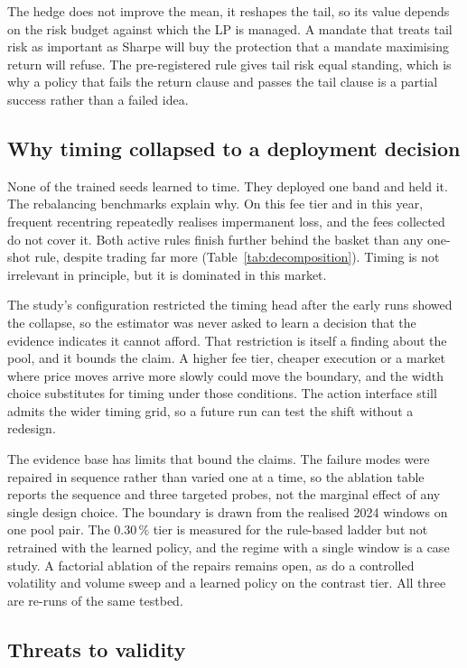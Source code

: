 The hedge does not improve the mean, it reshapes the tail, so its value depends
on the risk budget against which the LP is managed. A mandate that treats tail
risk as important as Sharpe will buy the protection that a mandate maximising
return will refuse. The pre-registered rule gives tail risk equal standing,
which is why a policy that fails the return clause and passes the tail clause
is a partial success rather than a failed idea.

\subsection{Why timing collapsed to a deployment decision}

None of the trained seeds learned to time. They deployed one band and held it.
The rebalancing benchmarks explain why. On this fee tier and in this year,
frequent recentring repeatedly realises impermanent loss, and the fees
collected do not cover it. Both active rules finish further behind the basket
than any one-shot rule, despite trading far more
(Table~\ref{tab:decomposition}). Timing is not irrelevant in principle, but it
is dominated in this market.

The study's configuration restricted the timing head after the early runs
showed the collapse, so the estimator was never asked to learn a decision that
the evidence indicates it cannot afford. That restriction is itself a finding
about the pool, and it bounds the claim. A higher fee tier, cheaper execution or
a market where price moves arrive more slowly could move the boundary, and the
width choice substitutes for timing under those conditions. The action
interface still admits the wider timing grid, so a future run can test the shift
without a redesign.

The evidence base has limits that bound the claims. The failure modes were
repaired in sequence rather than varied one at a time, so the ablation table
reports the sequence and three targeted probes, not the marginal effect of any
single design choice. The boundary is drawn from the realised 2024 windows on one pool
pair. The $0.30\,\%$ tier is measured for the rule-based ladder but not
retrained with the learned policy, and the regime with a single window is a
case study. A factorial ablation of the repairs remains open, as do a controlled
volatility and volume sweep and a learned policy on the contrast tier. All
three are re-runs of the same testbed.

\subsection{Threats to validity}

